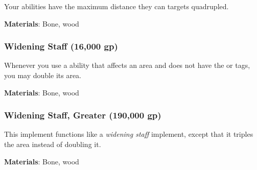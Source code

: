 Your  abilities have the maximum distance they can  targets quadrupled.



\vspace{0.25em}
\textbf{Materials}: Bone, wood


\lowercase{\hypertarget{item:Widening Staff}{}}\label{item:Widening Staff}
\hypertarget{item:Widening Staff}{\subsubsection{Widening Staff\hfill{} (16,000 gp)}}

Whenever you use a  ability that affects an area and does not have the  or  tags, you may double its area.



\vspace{0.25em}
\textbf{Materials}: Bone, wood


\lowercase{\hypertarget{item:Widening Staff, Greater}{}}\label{item:Widening Staff, Greater}
\hypertarget{item:Widening Staff, Greater}{\subsubsection{Widening Staff, Greater\hfill{} (190,000 gp)}}

This implement functions like a \textit{widening staff} implement, except that it triples the area instead of doubling it.



\vspace{0.25em}
\textbf{Materials}: Bone, wood
